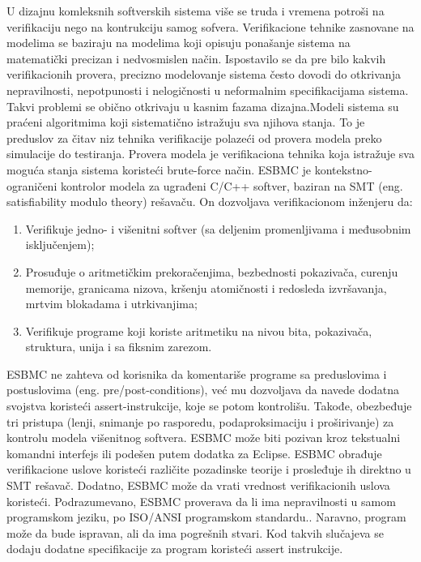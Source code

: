 \documentclass[a4paper]{article}
\begin{document}
	U dizajnu komleksnih softverskih sistema više se truda i vremena potroši na
	verifikaciju nego na kontrukciju samog sofvera. Verifikacione tehnike  zasnovane na modelima se baziraju na modelima koji opisuju ponašanje sistema na matematički precizan i nedvosmislen način. Ispostavilo se da pre bilo kakvih verifikacionih provera, precizno modelovanje sistema često dovodi do otkrivanja nepravilnosti, nepotpunosti i nelogičnosti u neformalnim specifikacijama sistema. Takvi problemi se obično otkrivaju u kasnim fazama dizajna.Modeli sistema su praćeni algoritmima koji sistematično istražuju sva njihova stanja. To je preduslov za čitav niz tehnika verifikacije polazeći od provera modela preko simulacije do testiranja.
	Provera modela je verifikaciona tehnika koja istražuje sva moguća stanja sistema koristeći brute-force način.
	\newline
	ESBMC je kontekstno-ograničeni kontrolor modela za ugrađeni C/C++ softver, baziran na SMT (eng. satisﬁability modulo theory) rešavaču.  On dozvoljava verifikacionom inženjeru da: 
	\newline
	\begin{enumerate}
	\item Verifikuje jedno- i višenitni softver (sa deljenim promenljivama i                       međusobnim isključenjem);
	\item Prosuđuje o aritmetičkim prekoračenjima, bezbednosti pokazivača, curenju               memorije, granicama nizova, kršenju atomičnosti i redosleda izvršavanja,             mrtvim blokadama i utrkivanjima; 
	\item Verifikuje programe koji koriste aritmetiku na nivou bita, pokazivača,                  struktura, unija i sa fiksnim zarezom.
	\end{enumerate}
	ESBMC ne zahteva od korisnika da komentariše programe sa preduslovima i postuslovima (eng. pre/post-conditions), već mu dozvoljava da navede dodatna svojstva koristeći assert-instrukcije, koje se potom kontrolišu. Takođe, obezbeđuje tri pristupa (lenji, snimanje po rasporedu, podaproksimaciju i proširivanje) za kontrolu modela višenitnog softvera. ESBMC može biti pozivan kroz tekstualni komandni interfejs ili podešen putem dodatka za Eclipse. ESBMC obrađuje verifikacione uslove koristeći različite pozadinske teorije i prosleđuje ih direktno u SMT rešavač. Dodatno, ESBMC može da vrati vrednost verifikacionih uslova koristeći.
	\newline
	Podrazumevano, ESBMC proverava da li ima nepravilnosti u samom programskom jeziku, po ISO/ANSI programskom standardu.. Naravno, program može da bude ispravan, ali da ima pogrešnih stvari. Kod takvih slučajeva se dodaju dodatne specifikacije za program koristeći assert instrukcije. 
\end{document}
